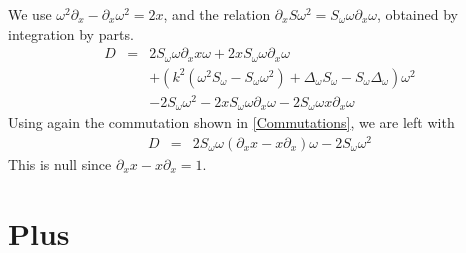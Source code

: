 \documentclass[a4paper]{article}
\begin{document}
	We use $\omega^2 \partial_x - \partial_x \omega^2 = 2x$, and the relation $\partial_x S \omega^2 = S_\omega \omega \partial_x \omega$, obtained by integration by parts. 
	\begin{eqnarray*}
		D &=& 2 S_\omega \omega \partial_x x\omega + 2 x S_\omega  \omega \partial_x \omega \\
		&& + \left(k^2(\omega^2 S_\omega - S_\omega \omega^2) + \Delta_\omega S_\omega - S_\omega \Delta_\omega \right)\omega^2\\
		&& - 2 S_\omega \omega^2 - 2 x  S_\omega \omega \partial_x \omega - 2 S_\omega \omega x \partial_x \omega
	\end{eqnarray*}
	Using again the commutation shown in \autoref{Commutations}, we are left with 
	\begin{eqnarray*}
		D &=&  2 S_\omega \omega (\partial_x x - x \partial_x) \omega - 2 S_\omega \omega^2
	\end{eqnarray*}
	This is null since $\partial_x x - x \partial_x = 1$. 
	
	\section{Plus}
	
	
	
	
	
	
	
	
	
	
	
	
	
	
\end{document}
